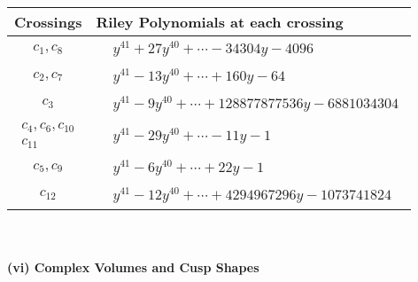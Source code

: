 \documentclass[1p]{elsarticle_modified}
\theoremstyle{definition}
\begin{document}
\begin{tabular}{m{50pt}|m{274pt}}
Crossings & \hspace{64pt}Riley Polynomials at each crossing \\
\hline $$\begin{aligned}c_{1},c_{8}\end{aligned}$$&$\begin{aligned}
&y^{41}+27 y^{40}+\cdots-34304 y-4096
\end{aligned}$\\
\hline $$\begin{aligned}c_{2},c_{7}\end{aligned}$$&$\begin{aligned}
&y^{41}-13 y^{40}+\cdots+160 y-64
\end{aligned}$\\
\hline $$\begin{aligned}c_{3}\end{aligned}$$&$\begin{aligned}
&y^{41}-9 y^{40}+\cdots+128877877536 y-6881034304
\end{aligned}$\\
\hline $$\begin{aligned}c_{4},c_{6},c_{10}\\c_{11}\end{aligned}$$&$\begin{aligned}
&y^{41}-29 y^{40}+\cdots-11 y-1
\end{aligned}$\\
\hline $$\begin{aligned}c_{5},c_{9}\end{aligned}$$&$\begin{aligned}
&y^{41}-6 y^{40}+\cdots+22 y-1
\end{aligned}$\\
\hline $$\begin{aligned}c_{12}\end{aligned}$$&$\begin{aligned}
&y^{41}-12 y^{40}+\cdots+4294967296 y-1073741824
\end{aligned}$\\
\hline
\end{tabular}\\~\\
\newpage\flushleft \textbf{(vi) Complex Volumes and Cusp Shapes}
\end{document}
